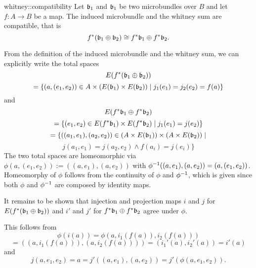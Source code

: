 \begin{mylemma}{whitney::compatibility}
    Let $\mathfrak{b}_1$ and $\mathfrak{b}_1$ be two microbundles over $B$ and let $f: A \to B$ be a map.
    The induced microbundle and the whitney sum are compatible, that is
    \[ f^*(\mathfrak{b}_1 \oplus{} \mathfrak{b}_2) \cong f^*\mathfrak{b}_1 \oplus{} f^*\mathfrak{b}_2. \]
\end{mylemma}

\begin{myproof}
    From the definition of the induced microbundle and the whitney sum, we can explicitly write the total spaces
    \[ E(f^*(\mathfrak{b}_1 \oplus{} \mathfrak{b}_2)) \]
    \[ = \{(a, (e_1, e_2)) \in A \times (E(\mathfrak{b}_1) \times E(\mathfrak{b}_2)) \mid j_1(e_1) = j_2(e_2) = f(a) \} \]
    and
    \[ E(f^*\mathfrak{b}_1 \oplus{} f^*\mathfrak{b}_2) \]
    \[ = \{(e_1, e_2) \in E(f^*\mathfrak{b}_1) \times E(f^*\mathfrak{b}_2) \mid j_1(e_1) = j(e_2)\}\]
    \[ = \{((a_1, e_1), (a_2, e_2)) \in (A \times E(\mathfrak{b}_1)) \times (A \times E(\mathfrak{b}_2)) \mid \]
    \[ j(a_1, e_1) = j(a_2, e_2) \land f(a_i) = j(e_i)\} \]
    The two total spaces are homeomorphic via $\phi(a, (e_1, e_2)) := ((a, e_1), (a, e_2))$ with $\phi^{-1}((a, e_1), (a, e_2)) = (a, (e_1, e_2))$.
    Homeomorphy of $\phi$ follows from the continuity of $\phi$ and $\phi^{-1}$, which is given since both $\phi$ and $\phi^{-1}$ are composed by identity maps.
    
    It remains to be shown that injection and projection maps $i$ and $j$ for $E(f^*(\mathfrak{b}_1 \oplus{} \mathfrak{b}_2))$
    and $i'$ and $j'$ for $f^*\mathfrak{b}_1 \oplus{} f^*\mathfrak{b}_2$ agree under $\phi$.

    This follows from
    \[ \phi(i(a)) = \phi(a, i_1(f(a)), i_2(f(a))) \]
    \[ = ((a, i_1(f(a))), (a, i_2(f(a)))) = (i_1'(a), i_2'(a)) = i'(a) \]
    and
    \[ j(a, e_1, e_2) = a = j'((a, e_1), (a, e_2)) = j'(\phi(a, e_1, e_2)). \]
\end{myproof}